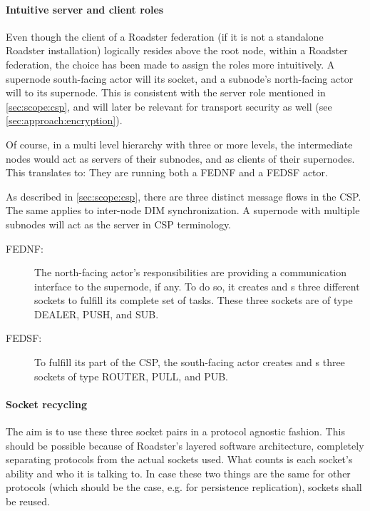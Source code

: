 \paragraph{Intuitive server and client roles}
Even though the client of a Roadster federation (if it is not a standalone
Roadster installation) logically resides above the root node, within a Roadster
federation, the choice has been made to assign the roles more intuitively. A
supernode south-facing actor will  its socket, and a subnode's
north-facing actor will  to its supernode. This is consistent
with the server role mentioned in \autoref{sec:scope:csp}, and will later be
relevant for transport security as well (see \autoref{sec:approach:encryption}).

Of course, in a multi level hierarchy with three or more levels, the
intermediate nodes would act as servers of their subnodes, and as clients of
their supernodes. This translates to: They are running both a FEDNF and a FEDSF
actor.

As described in \autoref{sec:scope:csp}, there are three distinct message flows
in the \gls{CSP}. The same applies to inter-node DIM synchronization. A
supernode with multiple subnodes will act as the server in CSP terminology.

\begin{description}
	\item [FEDNF:]
		The north-facing actor's responsibilities are providing a
		communication interface to the supernode, if any. To do so, it
		creates and s three different sockets to fulfill
		its complete set of tasks. These three sockets are of type
		DEALER, PUSH, and SUB.

	\item [FEDSF:]
		To fulfill its part of the CSP, the south-facing actor creates
		and s three sockets of type ROUTER, PULL, and PUB.
\end{description}

\paragraph{Socket recycling}
The aim is to use these three socket pairs in a protocol agnostic fashion. This
should be possible because of Roadster's layered software architecture,
completely separating protocols from the actual sockets used. What counts is
each socket's ability and who it is talking to. In case these two things are the
same for other protocols (which should be the case, e.g. for persistence
replication), sockets shall be reused.


